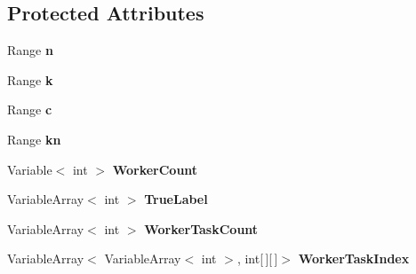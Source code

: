\subsection*{Protected Attributes}
\begin{DoxyCompactItemize}
\item 
\hypertarget{class_crowdsourcing_models_1_1_b_c_c_aa58ee434d4e8d8b391040d117054938d}{}Range {\bfseries n}\label{class_crowdsourcing_models_1_1_b_c_c_aa58ee434d4e8d8b391040d117054938d}

\item 
\hypertarget{class_crowdsourcing_models_1_1_b_c_c_afd5435718898d47b9c3ff5594fa2f283}{}Range {\bfseries k}\label{class_crowdsourcing_models_1_1_b_c_c_afd5435718898d47b9c3ff5594fa2f283}

\item 
\hypertarget{class_crowdsourcing_models_1_1_b_c_c_a97200049317251fa92243337840b2328}{}Range {\bfseries c}\label{class_crowdsourcing_models_1_1_b_c_c_a97200049317251fa92243337840b2328}

\item 
\hypertarget{class_crowdsourcing_models_1_1_b_c_c_a2b3ffffefe49c01347455642fd863ef9}{}Range {\bfseries kn}\label{class_crowdsourcing_models_1_1_b_c_c_a2b3ffffefe49c01347455642fd863ef9}

\item 
\hypertarget{class_crowdsourcing_models_1_1_b_c_c_a685b9761476672147cc8936b1bfcc648}{}Variable$<$ int $>$ {\bfseries Worker\+Count}\label{class_crowdsourcing_models_1_1_b_c_c_a685b9761476672147cc8936b1bfcc648}

\item 
\hypertarget{class_crowdsourcing_models_1_1_b_c_c_a42f64f08ee33de60165c9e636f689434}{}Variable\+Array$<$ int $>$ {\bfseries True\+Label}\label{class_crowdsourcing_models_1_1_b_c_c_a42f64f08ee33de60165c9e636f689434}

\item 
\hypertarget{class_crowdsourcing_models_1_1_b_c_c_a0a39bdc086e5fbb275295379ba4d97a2}{}Variable\+Array$<$ int $>$ {\bfseries Worker\+Task\+Count}\label{class_crowdsourcing_models_1_1_b_c_c_a0a39bdc086e5fbb275295379ba4d97a2}

\item 
\hypertarget{class_crowdsourcing_models_1_1_b_c_c_a937ccca220ce098a54e11e19e57e6a40}{}Variable\+Array$<$ Variable\+Array$<$ int $>$, int\mbox{[}$\,$\mbox{]}\mbox{[}$\,$\mbox{]}$>$ {\bfseries Worker\+Task\+Index}\label{class_crowdsourcing_models_1_1_b_c_c_a937ccca220ce098a54e11e19e57e6a40}


\end{DoxyCompactItemize}
